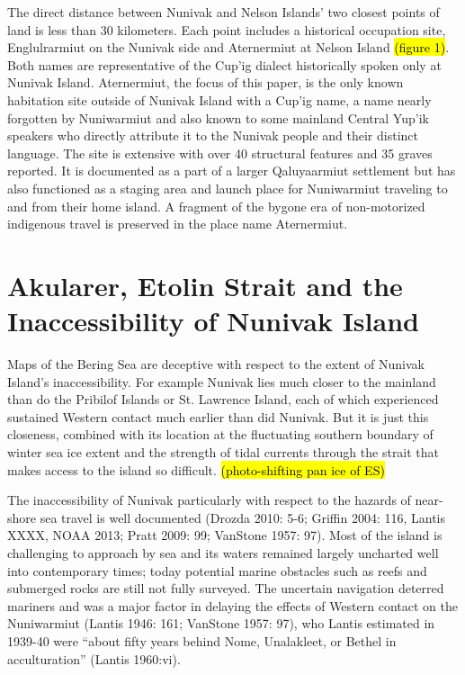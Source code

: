 The direct distance between Nunivak and Nelson Islands’ two closest points of land is less than 30 kilometers. Each point includes a historical occupation site, Englulrarmiut on the Nunivak side and Aternermiut at Nelson Island \hl{(figure 1)}. Both names are representative of the Cup’ig dialect historically spoken only at Nunivak Island. Aternermiut, the focus of this paper, is the only known habitation site outside of Nunivak Island with a Cup’ig name, a name nearly forgotten by Nuniwarmiut and also known to some mainland Central Yup’ik speakers who directly attribute it to the Nunivak people and their distinct language. The site is extensive with over 40 structural features and 35 graves reported. It is documented as a part of a larger Qaluyaarmiut settlement but has also functioned as a staging area and launch place for Nuniwarmiut traveling to and from their home island. A fragment of the bygone era of non-motorized indigenous travel is preserved in the place name Aternermiut.


\section{Akularer, Etolin Strait and the Inaccessibility of Nunivak Island}

Maps of the Bering Sea are deceptive with respect to the extent of Nunivak Island’s inaccessibility. For example Nunivak lies much closer to the mainland than do the Pribilof Islands or St. Lawrence Island, each of which experienced sustained Western contact much earlier than did Nunivak. But it is just this closeness, combined with its location at the fluctuating southern boundary of winter sea ice extent and the strength of tidal currents through the strait that makes access to the island so difficult. \hl{(photo-shifting pan ice of ES)}

The inaccessibility of Nunivak particularly with respect to the hazards of near-shore sea travel is well documented (Drozda 2010: 5-6; Griffin 2004: 116, Lantis XXXX, NOAA 2013; Pratt 2009: 99; VanStone 1957: 97). Most of the island is challenging to approach by sea and its waters remained largely uncharted well into contemporary times; today potential marine obstacles such as reefs and submerged rocks are still not fully surveyed. The uncertain navigation deterred mariners and was a major factor in delaying the effects of Western contact on the Nuniwarmiut (Lantis 1946: 161; VanStone 1957: 97),  who Lantis estimated in 1939-40 were “about fifty years behind Nome, Unalakleet, or Bethel in acculturation” (Lantis 1960:vi).

